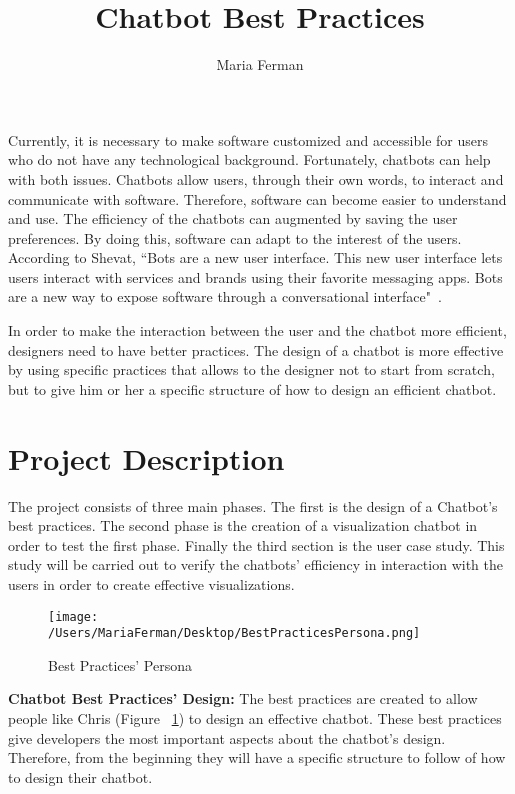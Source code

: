 \documentclass[a4paper,10pt]{article}
\title{Chatbot Best Practices}
\author{Maria Ferman}
\begin{document}
\maketitle
Currently, it is necessary to make software customized and accessible for users who do not have any technological background. Fortunately, chatbots can help with both issues. Chatbots allow users, through their own words, to interact and communicate with software. Therefore, software can become easier to understand and use. The efficiency of the chatbots can augmented by saving the user preferences. By doing this, software can adapt to the interest of the users. According to Shevat,  ``Bots are a new user interface. This new user interface lets users interact with services and brands using their favorite messaging apps. Bots are a new way to expose software through a conversational interface"~\cite{Shevat2017}. 

In order to make the interaction between the user and the chatbot more efficient, designers need to have better practices. 
The design of a chatbot is more effective by using specific practices that allows to the designer not to start from scratch, but to give him or her a specific structure of how to design an efficient chatbot. 

\section*{Project Description}

The project consists of three main phases. The first is the design of a Chatbot's best practices. The second phase is the creation of a visualization chatbot in order to test the first phase. Finally the third section is the user case study. This study will be carried out to verify the chatbots' efficiency in interaction with the users in order to create effective visualizations.

\begin{figure}
\centering
\texttt{[image: /Users/MariaFerman/Desktop/BestPracticesPersona.png]}
\caption{Best Practices' Persona}
\label{FigureChris}
\end{figure}

\textbf{Chatbot Best Practices' Design:} The best practices are created to allow people like Chris (Figure ~\ref{FigureChris}) to design an effective chatbot. These best practices give developers the most important aspects about the chatbot's design. Therefore, from the beginning they will have a specific structure to follow of how to design  their chatbot.
\end{document}
